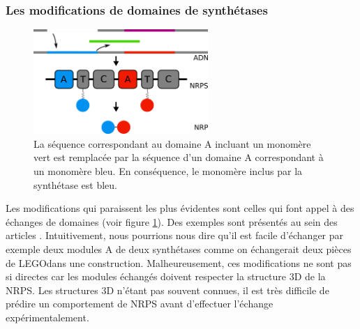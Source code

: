\subsubsection{Les modifications de domaines de synthétases}

\begin{figure}[h!]
  \begin{center}
    \includegraphics[width=250px]{Figures/synthese/echange.png}
    \caption{\label{echange}La séquence correspondant au domaine A incluant un monomère vert est remplacée par la séquence d'un domaine A correspondant à un monomère bleu.
    En conséquence, le monomère inclus par la synthétase est bleu.}
  \end{center}
\end{figure}

Les modifications qui paraissent les plus évidentes sont celles qui font appel à des échanges de domaines (voir figure \ref{echange}).
Des exemples sont présentés au sein des articles \cite{cane_harnessing_1998,kim_reinvigorating_2015}.
Intuitivement, nous pourrions nous dire qu'il est facile d'échanger par exemple deux modules A de deux synthétases comme on échangerait deux pièces de LEGO\textregistered dans une construction.
Malheureusement, ces modifications ne sont pas si directes car les modules échangés doivent respecter la structure 3D de la NRPS.
Les structures 3D n'étant pas souvent connues, il est très difficile de prédire un comportement de NRPS avant d'effectuer l'échange expérimentalement.


